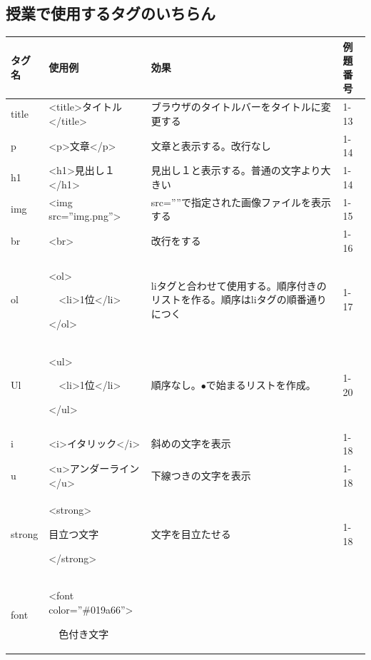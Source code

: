\documentclass[a4paper,12pt]{jarticle}
\begin{document}
\clearpage\subsection{授業で使用するタグのいちらん}
{\small
\begin{center}
\tablefirsthead{}
\tablehead{}
\tabletail{}
\tablelasttail{}
\begin{supertabular}{|m{2.171cm}|m{4.1060004cm}|m{7.8930006cm}|m{2.037cm}|}
\hline
タグ名 &
使用例 &
効果 &
例題番号\\\hline
title &
{\textless}title{\textgreater}タイトル{\textless}/title{\textgreater} &
ブラウザのタイトルバーをタイトルに変更する
&
1-13\\\hline
p &
{\textless}p{\textgreater}文章{\textless}/p{\textgreater} &
文章と表示する。改行なし &
1-14\\\hline
h1 &
{\textless}h1{\textgreater}見出し１{\textless}/h1{\textgreater} &
見出し１と表示する。普通の文字より大きい
&
1-14\\\hline
img &
{\textless}img src=”img.png”{\textgreater} &
src=””で指定された画像ファイルを表示する
&
1-15\\\hline
br &
{\textless}br{\textgreater} &
改行をする &
1-16\\\hline
ol &
{\textless}ol{\textgreater}

\ \ {\textless}li{\textgreater}1位{\textless}/li{\textgreater}

{\textless}/ol{\textgreater} &
liタグと合わせて使用する。順序付きのリストを作る。順序はliタグの順番通りにつく
&
1-17\\\hline
Ul &
{\textless}ul{\textgreater}

\ \ {\textless}li{\textgreater}1位{\textless}/li{\textgreater}

{\textless}/ul{\textgreater} &
順序なし。${\bullet}で始まるリストを作成。$
&
1-20\\\hline
i &
{\textless}i{\textgreater}イタリック{\textless}/i{\textgreater} &
斜めの文字を表示 &
1-18\\\hline
u &
{\textless}u{\textgreater}アンダーライン{\textless}/u{\textgreater} &
下線つきの文字を表示 &
1-18\\\hline
strong &
{\textless}strong{\textgreater}

目立つ文字

{\textless}/strong{\textgreater} &
文字を目立たせる &
1-18\\\hline
font  &
{\textless}font color=”\#019a66”{\textgreater}

\ \ 色付き文字


\end{supertabular}
\end{center}}
\end{document}

